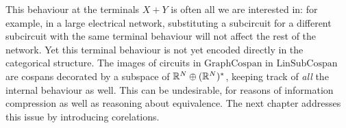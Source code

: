 This behaviour at the terminals $X+Y$ is often all we are interested in: for
example, in a large electrical network, substituting a subcircuit for a
different subcircuit with the same terminal behaviour will not affect the rest
of the network. Yet this terminal behaviour is not yet encoded directly in the
categorical structure. The images of circuits in $\mathrm{GraphCospan}$ in
$\mathrm{LinSubCospan}$ are cospans decorated by a subspace of ${\mathbb{R}}^N \oplus
({\mathbb{R}}^N)^\ast$, keeping track of \emph{all} the internal behaviour as well. This
can be undesirable, for reasons of information compression as well as reasoning
about equivalence. The next chapter addresses this issue by introducing corelations.

